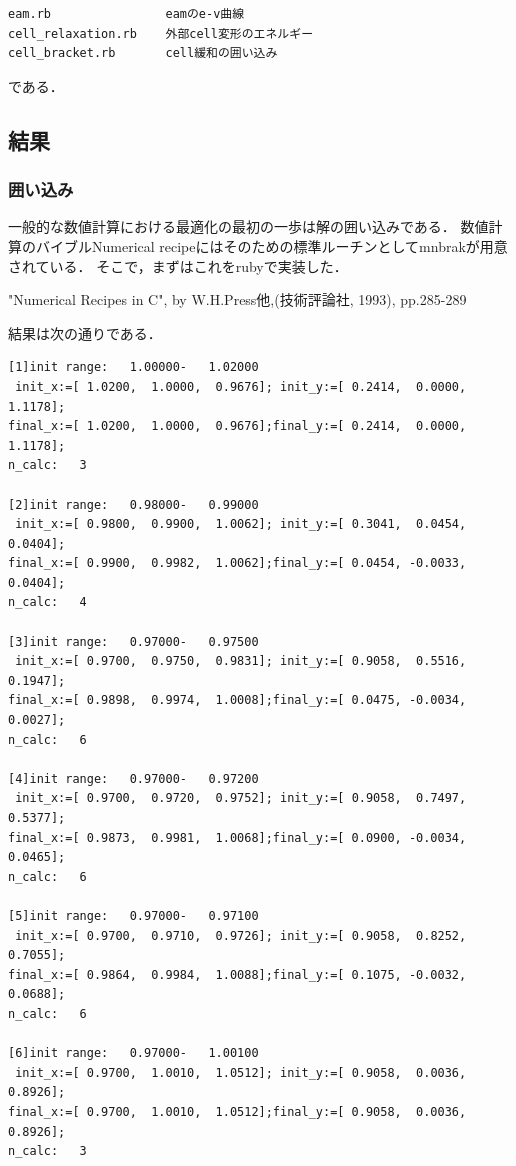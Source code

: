 \documentclass[11pt,dvipdfmx]{jsarticle}
\begin{document}
\begin{verbatim}
eam.rb                eamのe-v曲線
cell_relaxation.rb    外部cell変形のエネルギー
cell_bracket.rb       cell緩和の囲い込み
\end{verbatim}

である．

    \subsection{結果}\label{ux7d50ux679c}

    \subsubsection{囲い込み}\label{ux56f2ux3044ux8fbcux307f}

一般的な数値計算における最適化の最初の一歩は解の囲い込みである．
数値計算のバイブルNumerical
recipeにはそのための標準ルーチンとしてmnbrakが用意されている．
そこで，まずはこれをrubyで実装した．

"Numerical Recipes in C", by W.H.Press他,(技術評論社, 1993), pp.285-289

結果は次の通りである．

\begin{verbatim}
[1]init range:   1.00000-   1.02000
 init_x:=[ 1.0200,  1.0000,  0.9676]; init_y:=[ 0.2414,  0.0000,  1.1178];
final_x:=[ 1.0200,  1.0000,  0.9676];final_y:=[ 0.2414,  0.0000,  1.1178];
n_calc:   3

[2]init range:   0.98000-   0.99000
 init_x:=[ 0.9800,  0.9900,  1.0062]; init_y:=[ 0.3041,  0.0454,  0.0404];
final_x:=[ 0.9900,  0.9982,  1.0062];final_y:=[ 0.0454, -0.0033,  0.0404];
n_calc:   4

[3]init range:   0.97000-   0.97500
 init_x:=[ 0.9700,  0.9750,  0.9831]; init_y:=[ 0.9058,  0.5516,  0.1947];
final_x:=[ 0.9898,  0.9974,  1.0008];final_y:=[ 0.0475, -0.0034,  0.0027];
n_calc:   6

[4]init range:   0.97000-   0.97200
 init_x:=[ 0.9700,  0.9720,  0.9752]; init_y:=[ 0.9058,  0.7497,  0.5377];
final_x:=[ 0.9873,  0.9981,  1.0068];final_y:=[ 0.0900, -0.0034,  0.0465];
n_calc:   6

[5]init range:   0.97000-   0.97100
 init_x:=[ 0.9700,  0.9710,  0.9726]; init_y:=[ 0.9058,  0.8252,  0.7055];
final_x:=[ 0.9864,  0.9984,  1.0088];final_y:=[ 0.1075, -0.0032,  0.0688];
n_calc:   6

[6]init range:   0.97000-   1.00100
 init_x:=[ 0.9700,  1.0010,  1.0512]; init_y:=[ 0.9058,  0.0036,  0.8926];
final_x:=[ 0.9700,  1.0010,  1.0512];final_y:=[ 0.9058,  0.0036,  0.8926];
n_calc:   3
\end{verbatim}
\end{document}
